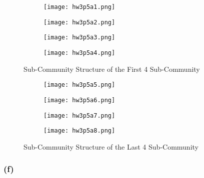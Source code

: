 \begin{figure}[h!]
	\centering
	\begin{subfigure}{.5\textwidth}
		\centering
		\texttt{[image: hw3p5a1.png]}	
	\end{subfigure}%
	\begin{subfigure}{.5\textwidth}
		\centering
		\texttt{[image: hw3p5a2.png]}
	\end{subfigure}
	\begin{subfigure}{.5\textwidth}
		\centering
		\texttt{[image: hw3p5a3.png]}	
	\end{subfigure}%
	\begin{subfigure}{.5\textwidth}
		\centering
		\texttt{[image: hw3p5a4.png]}
	\end{subfigure}
	\caption{Sub-Community Structure of the First 4 Sub-Community}
	\label{fig:e1}
\end{figure}

\begin{figure}[h!]
	\centering
	\begin{subfigure}{.5\textwidth}
		\centering
		\texttt{[image: hw3p5a5.png]}	
	\end{subfigure}%
	\begin{subfigure}{.5\textwidth}
		\centering
		\texttt{[image: hw3p5a6.png]}
	\end{subfigure}
	\begin{subfigure}{.5\textwidth}
		\centering
		\texttt{[image: hw3p5a7.png]}	
	\end{subfigure}%
	\begin{subfigure}{.5\textwidth}
		\centering
		\texttt{[image: hw3p5a8.png]}
	\end{subfigure}
	\caption{Sub-Community Structure of the Last 4 Sub-Community}
	\label{fig:e2}
\end{figure}

\subsubsection*{(f)}
